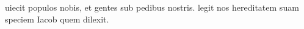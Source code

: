\documentclass[letter,12pt]{book}
\newcommand*\zallmancaps{\usefont{U}{Zallman}{xl}{n}}
\begin{document}
uiecit populos nobis, et gentes sub pedibus nostris.
legit nos hereditatem suam speciem Iacob quem dilexit.




\end{document}
